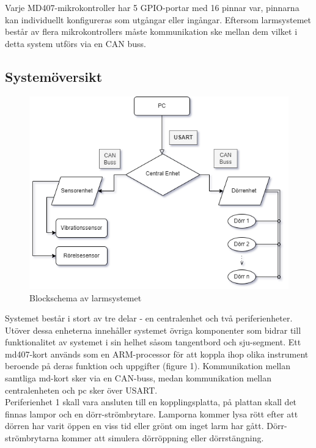 \documentclass{article}
\begin{document}
Varje MD407-mikrokontroller har 5 GPIO-portar med 16 pinnar var, pinnarna kan individuellt konfigureras som utgångar eller ingångar.
Eftersom larmsystemet består av flera mikrokontrollers måste kommunikation ske mellan dem vilket i detta system utförs via en CAN buss.

\subsection{Systemöversikt}

\begin{figure}[h]
    \centering
    \includegraphics[scale=0.8]{Projektrapport/diagram.png}
    \caption {Blockschema av larmsystemet}
    \label{fig:drawing}
\end{figure}

Systemet består i stort av tre delar - en centralenhet och två periferienheter. 
Utöver dessa enheterna innehåller systemet övriga komponenter som bidrar till funktionalitet av systemet i sin helhet såsom tangentbord och sju-segment. Ett md407-kort används som en ARM-processor för att koppla ihop olika instrument beroende på deras funktion och uppgifter (figure 1).
Kommunikation mellan samtliga md-kort sker via en CAN-buss, medan kommunikation mellan centralenheten och pc sker över USART. \\

Periferienhet 1 skall vara ansluten till en kopplingsplatta, på plattan skall det finnas lampor och en dörr-strömbrytare. 
Lamporna kommer lysa rött efter att dörren har varit öppen en viss tid eller grönt om inget larm har gått. 
Dörr-strömbrytarna kommer att simulera dörröppning eller dörrstängning. \\
\end{document}
